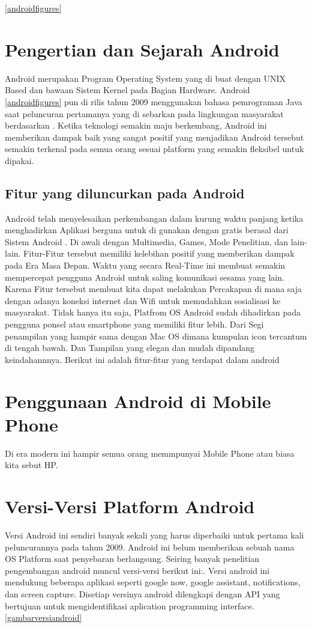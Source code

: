 
\ref{androidfigures}
\begin{figures}
\gambar{}
\section{Pengertian dan Sejarah Android}
	Android merupakan Program Operating System yang di buat dengan UNIX Based dan bawaan Sistem Kernel
	pada Bagian Hardware. Android \ref{androidfigures} pun di rilis tahun 2009 menggunakan bahasa pemrograman Java saat peluncuran pertamanya yang
	di sebarkan pada lingkungan masyarakat berdasarkan \cite{rasjid2015android}. Ketika teknologi semakin maju berkembang, Android ini memberikan dampak baik yang sangat positif
	yang menjadikan Android tersebut semakin terkenal pada semua orang sesuai platform yang semakin fleksibel untuk dipakai.
\subsection{Fitur yang diluncurkan pada Android}
	Android telah menyelesaikan perkembangan dalam kurung waktu panjang ketika menghadirkan Aplikasi berguna untuk di gunakan dengan gratis berasal dari Sistem Android . Di awali
	dengan Multimedia, Games, Mode Penelitian, dan lain-lain. Fitur-Fitur tersebut memiliki kelebihan positif yang memberikan dampak pada Era Masa Depan.
	Waktu yang secara Real-Time ini membuat semakin mempercepat pengguna Android untuk saling komunikasi sesama yang lain. Karena Fitur tersebut
	membuat kita dapat melakukan Percakapan di mana saja dengan adanya koneksi internet dan Wifi untuk memudahkan sosialisasi ke masyarakat.
	Tidak hanya itu saja, Platfrom OS Android sudah dihadirkan pada pengguna ponsel atau smartphone yang memiliki fitur lebih.
	Dari Segi penampilan yang hampir sama dengan Mac OS dimana kumpulan icon tercantum di tengah bawah. Dan Tampilan yang elegan dan mudah
	dipandang keindahannnya. Berikut ini adalah fitur-fitur yang terdapat dalam android \cite{triadi2013bedah}
\section{Penggunaan Android di Mobile Phone}
Di era modern ini hampir semua orang memmpunyai Mobile Phone atau biasa kita sebut HP. \cite{triadi2013bedah}
	
	\section{Versi-Versi Platform Android}
		Versi Android ini sendiri banyak sekali yang harus diperbaiki untuk pertama kali peluncurannya pada tahun 2009. Android ini belum memberikan sebuah nama OS Platform
		saat penyebaran berlangsung. Seiring banyak penelitian pengembangan android muncul versi-versi berikut ini:\cite{suryani2015rancang}. Versi android ini mendukung beberapa aplikasi seperti google now, google assistant, notifications, dan screen capture.
		Disetiap versinya android dilengkapi dengan API yang bertujuan untuk mengidentifikasi aplication programming interface.
	\ref{gambarversiandroid}

\end{figures}
